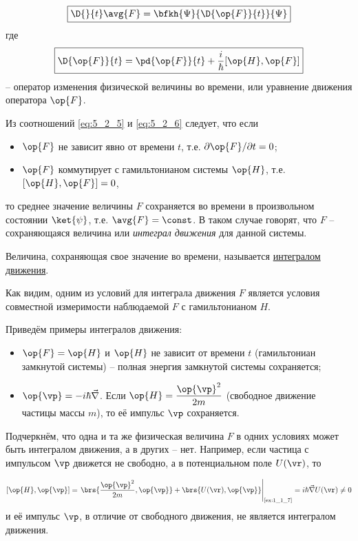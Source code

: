 \begin{equation}
\label{eq:5_2_5}
  \boxed{
    \D{}{t} \avg{F} = \bfkh{\Psi}{\D{\op{F}}{t}}{\Psi}
  }
\end{equation}%
%
где
\begin{equation}
\label{eq:5_2_6}
\boxed{\D{\op{F}}{t} = \pd{\op{F}}{t} + \frac{i}{\hbar} [\op{H}, \op{F}]}
\end{equation}
-- оператор изменения физической величины во времени, или уравнение движения оператора $\op{F}$.

Из соотношений \eqref{eq:5_2_5} и \eqref{eq:5_2_6} следует, что если
\begin{itemize}
\item $\op{F}$ не зависит явно от времени $t$, т.е. $\partial\op{F}/\partial{t} = 0$;
\item $\op{F}$ коммутирует с гамильтонианом системы $\op{H}$, т.е. $[\op{H}, \op{F}]=0$,
\end{itemize}%
%
то среднее значение величины $F$ сохраняется во времени в произвольном состоянии $\ket{\psi}$, т.е. $\avg{F} = \const$. В таком случае говорят, что $F$ -- сохраняющаяся величина или {\em интеграл движения} для данной системы.

\begin{defn}
Величина, сохраняющая свое значение во времени, называется \underline{интегралом движения}.
\end{defn}%
%
Как видим, одним из условий для интеграла движения $F$ является условия совместной измеримости наблюдаемой $F$ с гамильтонианом $H$.

Приведём примеры интегралов движения:

\begin{itemize}
\item $\op{F} = \op{H}$ и $\op{H}$ не зависит от времени $t$ (гамильтониан замкнутой системы) -- полная энергия замкнутой системы сохраняется;
\item $\op{\vp} = - i \hbar \vec{\nabla}$.  Если $\displaystyle\op{H} = \frac{\op{\vp}^2}{2m}$ (свободное движение частицы массы $m$), то её импульс $\vp$ сохраняется.
\end{itemize}%
%
Подчеркнём, что одна и та же физическая величина $F$ в одних условиях может быть интегралом движения, а в других -- нет. Например, если частица с импульсом $\vp$ движется не свободно, а в потенциальном поле $U(\vr)$, то

\begin{equation}
\label{eq:5_2_7}
  [\op{H}, \op{\vp}] =
  \left.
	\brs{\frac{\op{\vp}^2}{2m}, \op{\vp}} + \brs{U(\vr), \op{\vp}}
  \right|_{\text{\cref{ex:1_1_7}}} =
  i \hbar \vec{\nabla} U(\vr) \ne 0
\end{equation}%
%
и её импульс $\vp$, в отличие от свободного движения, не является интегралом движения.

